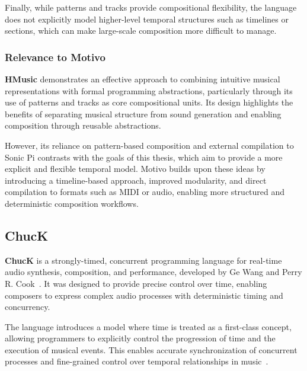 Finally, while patterns and tracks provide compositional flexibility, the language does not explicitly model
higher-level temporal structures such as timelines or sections, which can make large-scale composition more difficult to
manage.


\subsubsection{Relevance to Motivo}

\textbf{HMusic} demonstrates an effective approach to combining intuitive musical representations with formal
programming abstractions, particularly through its use of patterns and tracks as core compositional units.
Its design highlights the benefits of separating musical structure from sound generation and enabling composition
through reusable abstractions.

However, its reliance on pattern-based composition and external compilation to Sonic Pi contrasts with the goals of
this thesis, which aim to provide a more explicit and flexible temporal model.
Motivo builds upon these ideas by introducing a timeline-based approach, improved modularity, and direct
compilation to formats such as MIDI or audio, enabling more structured and deterministic composition workflows.


\subsection{ChucK}\label{detail-subsec:chuck}

\textbf{ChucK} is a strongly-timed, concurrent programming language for real-time audio synthesis, composition, and
performance, developed by Ge Wang and Perry R. Cook~\cite{Wang_Cook_2003}.
It was designed to provide precise control over time, enabling composers to express complex audio processes with
deterministic timing and concurrency.

The language introduces a model where time is treated as a first-class concept, allowing programmers to explicitly
control the progression of time and the execution of musical events.
This enables accurate synchronization of concurrent processes and fine-grained control over temporal relationships in
music~\cite{Wang_Cook_2003}.

